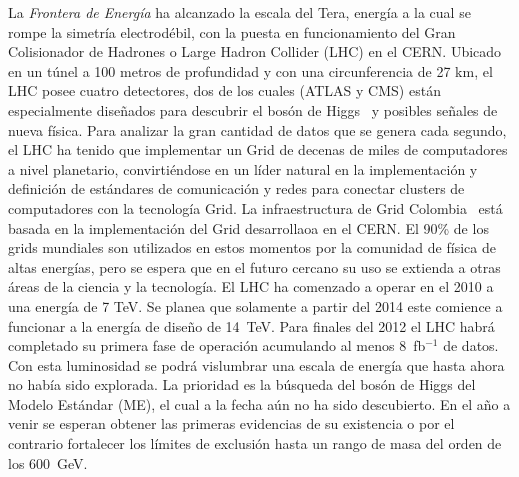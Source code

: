 La \emph{Frontera de Energía} ha alcanzado la escala del Tera, 
energía a la cual se rompe la simetría electrodébil, con la puesta en
funcionamiento del Gran Colisionador de Hadrones o
Large Hadron Collider (LHC) en el CERN. Ubicado en un túnel a
100 metros de profundidad y con una circunferencia de 27 km, el LHC
posee cuatro detectores, dos de los cuales (ATLAS y CMS) están
especialmente diseñados para descubrir el bosón de Higgs~\cite{Higgs:1964pj,Higgs:1966ev,Englert:1964et,Guralnik:1964eu} y posibles señales de nueva
física. Para analizar la gran cantidad de datos que se genera cada
segundo, el LHC ha tenido que implementar un Grid de decenas de miles
de computadores a nivel planetario, convirtiéndose en un líder natural
en la implementación y definición de estándares de comunicación y
redes para conectar clusters de computadores con la tecnología
Grid. La infraestructura de Grid Colombia~\cite{gridcolombia} está basada en la
implementación del Grid desarrollaoa en el CERN. El 90\% de los grids
mundiales son utilizados en estos momentos por la comunidad de física de
altas energías, pero se espera que en el futuro cercano su uso se
extienda a otras áreas de la ciencia y la tecnología. El LHC ha
comenzado a operar en el 2010 a una energía de 7 TeV.
Se planea que solamente a partir del 2014
este comience a funcionar a la energía de diseño de
14~TeV. Para finales del 2012 el LHC habrá completado su primera fase
de operación
acumulando al menos 8~fb$^{-1}$ de datos. Con esta luminosidad se podrá
vislumbrar una escala de energía que hasta ahora no había sido
explorada. La prioridad es la búsqueda del bosón de Higgs del Modelo Estándar (ME),
el cual a la fecha aún no ha sido descubierto. En el año a venir
se esperan obtener las primeras evidencias de su existencia o
por el contrario fortalecer los límites de exclusión hasta un rango de masa
del orden de los 600~GeV.

